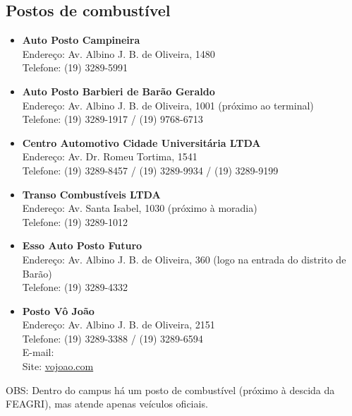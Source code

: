 \subsection{Postos de combustível}

\begin{itemize}
    \item   \textbf{Auto Posto Campineira}
        \\Endereço: Av. Albino J. B. de Oliveira, 1480
        \\Telefone: (19) 3289-5991

    \item   \textbf{Auto Posto Barbieri de Barão Geraldo}
        \\Endereço: Av. Albino J. B. de Oliveira, 1001 (próximo ao terminal)
        \\Telefone: (19) 3289-1917 / (19) 9768-6713

    \item   \textbf{Centro Automotivo Cidade Universitária LTDA}
        \\Endereço: Av. Dr. Romeu Tortima, 1541
        \\Telefone: (19) 3289-8457 / (19) 3289-9934 / (19) 3289-9199

    \item   \textbf{Transo Combustíveis LTDA}
        \\Endereço: Av. Santa Isabel, 1030 (próximo à moradia)
        \\Telefone: (19) 3289-1012

    \item   \textbf{Esso Auto Posto Futuro}
        \\Endereço: Av. Albino J. B. de Oliveira, 360 (logo na entrada do distrito de Barão)
        \\Telefone: (19) 3289-4332

    \item   \textbf{Posto Vô João}
        \\Endereço: Av. Albino J. B. de Oliveira, 2151
        \\Telefone: (19) 3289-3388 / (19) 3289-6594
        \\E-mail: 
        \\Site: \url{vojoao.com}
\end{itemize}

OBS: Dentro do campus há um posto de combustível (próximo à descida da FEAGRI),
mas atende apenas veículos oficiais.
